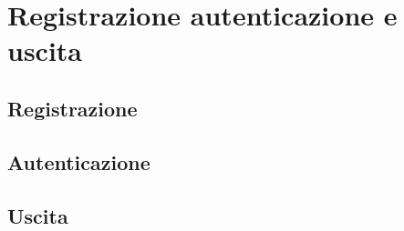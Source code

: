 \newpage
\section{Registrazione autenticazione e uscita}
\subsection{Registrazione}
\subsection{Autenticazione}
\subsection{Uscita}